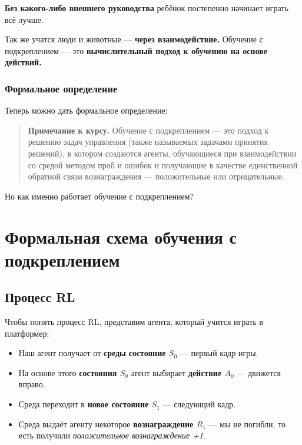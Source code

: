 \documentclass[11pt,a4paper]{article}
\begin{document}
\textbf{Без какого-либо внешнего руководства} ребёнок постепенно начинает играть всё лучше.

Так же учатся люди и животные --- \textbf{через взаимодействие.} Обучение с подкреплением --- это \textbf{вычислительный подход к обучению на основе действий.}

\subsubsection{Формальное определение}\label{a-formal-definition}

Теперь можно дать формальное определение:

\begin{quote}
\textbf{Примечание к курсу.} Обучение с подкреплением --- это подход к решению задач управления (также называемых задачами принятия решений), в котором создаются агенты, обучающиеся при взаимодействии со средой методом проб и ошибок и получающие в качестве единственной обратной связи вознаграждения --- положительные или отрицательные.
\end{quote}

Но как именно работает обучение с подкреплением?

\section{Формальная схема обучения с подкреплением}\label{the-reinforcement-learning-framework}

\subsection{Процесс RL}\label{the-rl-process}



Чтобы понять процесс RL, представим агента, который учится играть в платформер:


\begin{itemize}
\tightlist
\item
  Наш агент получает от \textbf{среды} \textbf{состояние \(S_0\)} --- первый кадр игры.
\item
  На основе этого \textbf{состояния \(S_0\)} агент выбирает \textbf{действие \(A_0\)} --- движется вправо.
\item
  Среда переходит в \textbf{новое состояние \(S_1\)} --- следующий кадр.
\item
  Среда выдаёт агенту некоторое \textbf{вознаграждение \(R_1\)} --- мы не погибли, то есть получили \emph{положительное вознаграждение +1}.
\end{itemize}
\end{document}

